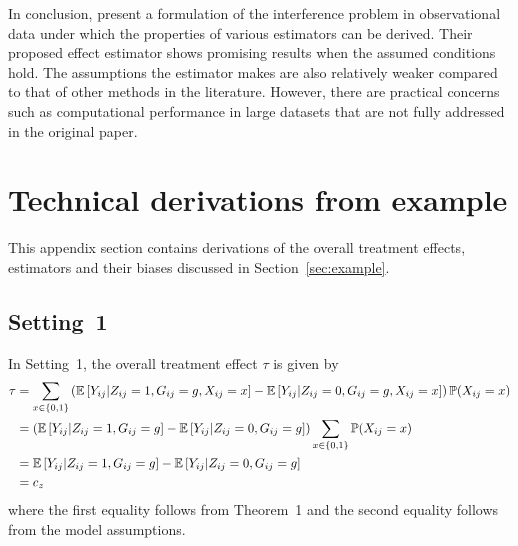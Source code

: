 \documentclass[10pt]{article}
\begin{document}
In conclusion, \textcite{Forastiere:2021} present a formulation of the interference problem in observational data under which the properties of various estimators can be derived. Their proposed effect estimator shows promising results when the assumed conditions hold. The assumptions the estimator makes are also relatively weaker compared to that of other methods in the literature. However, there are practical concerns such as computational performance in large datasets that are not fully addressed in the original paper.


\newpage


\begin{refcontext}[sorting=nyt]
\printbibliography
\end{refcontext}


\newpage

\appendix



\section{Technical derivations from example} \label{apx:example}

This appendix section contains derivations of the overall treatment effects, estimators and their biases discussed in Section~\ref{sec:example}.

\subsection{Setting~1} \label{apx:setting1}

In Setting~1, the overall treatment effect $\tau$ is given by
\begin{align*}
\tau %
&= \sum_{x\in\{0,1\}} \left(\E\left[Y_{ij}|Z_{ij}=1,G_{ij}=g,X_{ij}=x\right] - \E\left[Y_{ij}|Z_{ij}=0,G_{ij}=g,X_{ij}=x\right]\right)\P(X_{ij}=x) \\
&= \left(\E\left[Y_{ij}|Z_{ij}=1,G_{ij}=g\right] - \E\left[Y_{ij}|Z_{ij}=0,G_{ij}=g\right]\right)\sum_{x\in\{0,1\}}\P(X_{ij}=x) \\
&= \E\left[Y_{ij}|Z_{ij}=1,G_{ij}=g\right] - \E\left[Y_{ij}|Z_{ij}=0,G_{ij}=g\right] \\
&= c_z
\end{align*}
where the first equality follows from Theorem~1 and the second equality follows from the model assumptions.
\\
\end{document}
